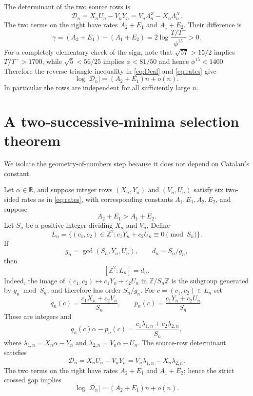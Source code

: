 \documentclass[11pt]{article}
\theoremstyle{definition}
\theoremstyle{remark}
\newcommand{\Z}{\mathbb Z}
\newcommand{\R}{\mathbb R}
\begin{document}
The determinant of the two source rows is
\begin{equation}\label{eq:Dcal}
\mathcal D_n=X_nU_n-V_nY_n
=V_n\Lambda_n^Z-X_n\Lambda_n^N.
\end{equation}
The two terms on the right have rates $A_2+E_1$ and $A_1+E_2$.  Their difference is
\begin{equation}\label{eq:gap}
\gamma=(A_2+E_1)-(A_1+E_2)
=2\log\frac{T/T^-}{\phi^{15}}>0.
\end{equation}
For a completely elementary check of the sign, note that
$\sqrt{57}>15/2$ implies $T/T^->1700$, while
$\sqrt5<56/25$ implies $\phi<81/50$ and hence $\phi^{15}<1400$.
Therefore the reverse triangle inequality in \eqref{eq:Dcal} and \eqref{eq:rates} give
\begin{equation}\label{eq:Drate}
\log|\mathcal D_n|=(A_2+E_1)n+o(n).
\end{equation}
In particular the rows are independent for all sufficiently large $n$.

\section{A two-successive-minima selection theorem}
We isolate the geometry-of-numbers step because it does not depend on Catalan's constant.

Let $\alpha\in\R$, and suppose integer rows $(X_n,Y_n)$ and $(V_n,U_n)$ satisfy six two-sided rates as in \eqref{eq:rates}, with corresponding constants $A_1,E_1,A_2,E_2$, and suppose
\[
A_2+E_1>A_1+E_2.
\]
Let $S_n$ be a positive integer dividing $X_n$ and $V_n$.  Define
\begin{equation}\label{eq:lattice}
L_n=\{(c_1,c_2)\in\Z^2:c_1Y_n+c_2U_n\equiv0\pmod{S_n}\}.
\end{equation}
If
\[
g_n=\gcd(S_n,Y_n,U_n),\qquad d_n=S_n/g_n,
\]
then
\begin{equation}\label{eq:index}
[\Z^2:L_n]=d_n.
\end{equation}
Indeed, the image of $(c_1,c_2)\mapsto c_1Y_n+c_2U_n$ in $\Z/S_n\Z$ is the subgroup generated by $g_n\bmod S_n$, and therefore has order $S_n/g_n$.
For $c=(c_1,c_2)\in L_n$ set
\begin{equation}\label{eq:outputs}
q_n(c)=\frac{c_1X_n+c_2V_n}{S_n},\qquad
p_n(c)=\frac{c_1Y_n+c_2U_n}{S_n}.
\end{equation}
These are integers and
\begin{equation}\label{eq:ellout}
q_n(c)\alpha-p_n(c)
=\frac{c_1\lambda_{1,n}+c_2\lambda_{2,n}}{S_n},
\end{equation}
where $\lambda_{1,n}=X_n\alpha-Y_n$ and $\lambda_{2,n}=V_n\alpha-U_n$.
The source-row determinant satisfies
\[
\mathcal D_n=X_nU_n-V_nY_n
=V_n\lambda_{1,n}-X_n\lambda_{2,n}.
\]
The two terms on the right have rates $A_2+E_1$ and $A_1+E_2$; hence the strict crossed gap implies
\begin{equation}\label{eq:abstract-Drate}
\log|\mathcal D_n|=(A_2+E_1)n+o(n).
\end{equation}
\end{document}
